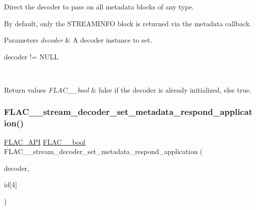 Direct the decoder to pass on all metadata blocks of any type.

By default, only the {\ttfamily S\+T\+R\+E\+A\+M\+I\+N\+FO} block is returned via the metadata callback. 
\begin{DoxyParams}{Parameters}
{\em decoder} & A decoder instance to set.  
\begin{DoxyCode}
decoder != NULL 
\end{DoxyCode}
 \\
\hline
\end{DoxyParams}

\begin{DoxyRetVals}{Return values}
{\em F\+L\+A\+C\+\_\+\+\_\+bool} & {\ttfamily false} if the decoder is already initialized, else {\ttfamily true}. \\
\hline
\end{DoxyRetVals}
\mbox{\label{group__flac__stream__decoder_gabf2a1e945eb2a158090665e03ff55ad2}} 
\subsubsection{\texorpdfstring{F\+L\+A\+C\+\_\+\+\_\+stream\+\_\+decoder\+\_\+set\+\_\+metadata\+\_\+respond\+\_\+application()}{FLAC\_\_stream\_decoder\_set\_metadata\_respond\_application()}}
{\footnotesize\ttfamily \hyperlink{group__flac__export_ga56ca07df8a23310707732b1c0007d6f5}{F\+L\+A\+C\+\_\+\+A\+PI} \hyperlink{ordinals_8h_a95103469f1cbd78b8cf250194985b34e}{F\+L\+A\+C\+\_\+\+\_\+bool} F\+L\+A\+C\+\_\+\+\_\+stream\+\_\+decoder\+\_\+set\+\_\+metadata\+\_\+respond\+\_\+application (\begin{DoxyParamCaption}\item[{\hyperlink{struct_f_l_a_c_____stream_decoder}{F\+L\+A\+C\+\_\+\+\_\+\+Stream\+Decoder} $\ast$}]{decoder,  }\item[{\hyperlink{zconf_8h_a2c212835823e3c54a8ab6d95c652660e}{const} \hyperlink{ordinals_8h_a5eb569b12d5b047cdacada4d57924ee3}{F\+L\+A\+C\+\_\+\+\_\+byte}}]{id\mbox{[}4\mbox{]} }\end{DoxyParamCaption})}

